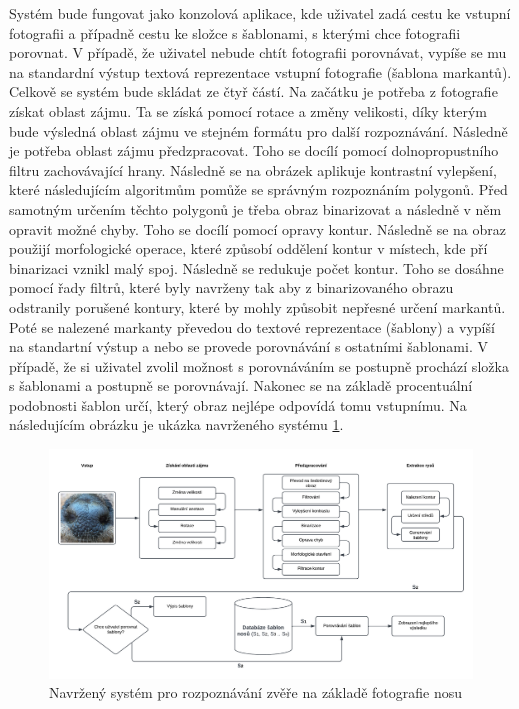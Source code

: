 Systém bude fungovat jako konzolová aplikace, kde uživatel zadá cestu ke vstupní fotografii a případně cestu ke složce s šablonami, s kterými chce fotografii porovnat. V případě, že uživatel nebude chtít fotografii porovnávat, vypíše se mu na standardní výstup textová reprezentace vstupní fotografie (šablona markantů). Celkově se systém bude skládat ze čtyř částí. Na začátku je potřeba z fotografie získat oblast zájmu. Ta se získá pomocí rotace a změny velikosti, díky kterým bude výsledná oblast zájmu ve stejném formátu pro další rozpoznávání. Následně je potřeba oblast zájmu předzpracovat. Toho se docílí pomocí dolnopropustního filtru zachovávající hrany. Následně se na obrázek aplikuje kontrastní vylepšení, které následujícím algoritmům pomůže se správným rozpoznáním polygonů. Před samotným určením těchto polygonů je třeba obraz binarizovat a následně v něm opravit možné chyby. Toho se docílí pomocí opravy kontur. Následně se na obraz použijí morfologické operace, které způsobí oddělení kontur v místech, kde pří binarizaci vznikl malý spoj. Následně se redukuje počet kontur. Toho se dosáhne pomocí řady filtrů, které byly navrženy tak aby z binarizovaného obrazu odstranily porušené kontury, které by mohly způsobit nepřesné určení markantů. Poté se nalezené markanty převedou do textové reprezentace (šablony) a vypíší na standartní výstup a nebo se provede porovnávání s ostatními šablonami. V případě, že si uživatel zvolil možnost s porovnáváním se postupně prochází složka s šablonami a postupně se porovnávají. Nakonec se na základě procentuální podobnosti šablon určí, který obraz nejlépe odpovídá tomu vstupnímu. Na následujícím obrázku je ukázka navrženého systému \ref{navrh_systemu}.


\begin{figure}[h]
	\centering
	\includegraphics[width=1\textwidth]{obrazky/navrzeny_system.png}
	\caption{Navržený systém pro rozpoznávání zvěře na základě fotografie nosu}
	\label{navrh_systemu}
\end{figure}


